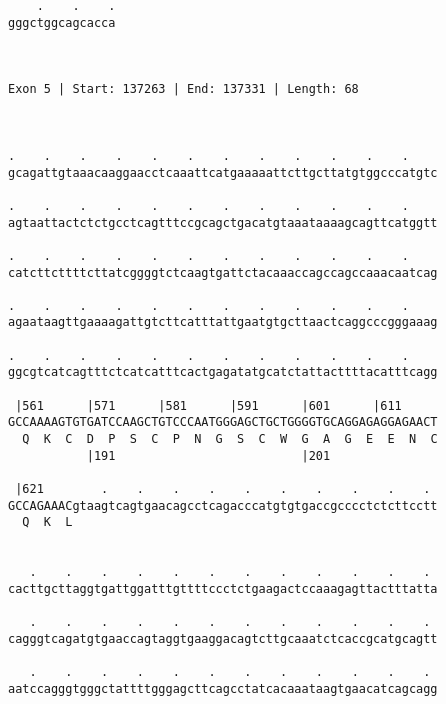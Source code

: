 \documentclass{article}
\begin{document}
\begin{Verbatim}
    .    .    .
gggctggcagcacca
               
               
 
Exon 5 | Start: 137263 | End: 137331 | Length: 68



.    .    .    .    .    .    .    .    .    .    .    .    
gcagattgtaaacaaggaacctcaaattcatgaaaaattcttgcttatgtggcccatgtc
                                                            
.    .    .    .    .    .    .    .    .    .    .    .    
agtaattactctctgcctcagtttccgcagctgacatgtaaataaaagcagttcatggtt
                                                            
.    .    .    .    .    .    .    .    .    .    .    .    
catcttcttttcttatcggggtctcaagtgattctacaaaccagccagccaaacaatcag
                                                            
.    .    .    .    .    .    .    .    .    .    .    .    
agaataagttgaaaagattgtcttcatttattgaatgtgcttaactcaggcccgggaaag
                                                            
.    .    .    .    .    .    .    .    .    .    .    .    
ggcgtcatcagtttctcatcatttcactgagatatgcatctattacttttacatttcagg
                                                            
 |561      |571      |581      |591      |601      |611     
GCCAAAAGTGTGATCCAAGCTGTCCCAATGGGAGCTGCTGGGGTGCAGGAGAGGAGAACT
  Q  K  C  D  P  S  C  P  N  G  S  C  W  G  A  G  E  E  N  C
           |191                          |201               
  
 |621        .    .    .    .    .    .    .    .    .    . 
GCCAGAAACgtaagtcagtgaacagcctcagacccatgtgtgaccgcccctctcttcctt
  Q  K  L                                                   
                                                            
  
   .    .    .    .    .    .    .    .    .    .    .    . 
cacttgcttaggtgattggatttgttttccctctgaagactccaaagagttactttatta
                                                            
   .    .    .    .    .    .    .    .    .    .    .    . 
cagggtcagatgtgaaccagtaggtgaaggacagtcttgcaaatctcaccgcatgcagtt
                                                            
   .    .    .    .    .    .    .    .    .    .    .    . 
aatccagggtgggctattttgggagcttcagcctatcacaaataagtgaacatcagcagg
                                                            

\end{Verbatim}
\end{document}
